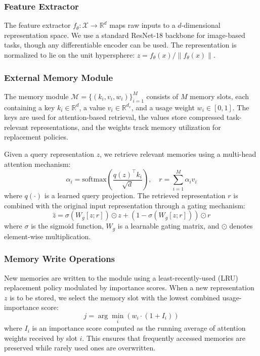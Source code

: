 \documentclass[11pt]{article}
\begin{document}
\subsubsection{Feature Extractor}

The feature extractor $f_\theta: \mathcal{X} \rightarrow \mathbb{R}^d$ maps raw inputs to a $d$-dimensional representation space. We use a standard ResNet-18 backbone \citep{he2016deep} for image-based tasks, though any differentiable encoder can be used. The representation is normalized to lie on the unit hypersphere: $z = f_\theta(x) / \|f_\theta(x)\|$.

\subsubsection{External Memory Module}

The memory module $\mathcal{M} = \{(k_i, v_i, w_i)\}_{i=1}^{M}$ consists of $M$ memory slots, each containing a key $k_i \in \mathbb{R}^d$, a value $v_i \in \mathbb{R}^{d_v}$, and a usage weight $w_i \in [0, 1]$. The keys are used for attention-based retrieval, the values store compressed task-relevant representations, and the weights track memory utilization for replacement policies.

Given a query representation $z$, we retrieve relevant memories using a multi-head attention mechanism:
\begin{equation}
    \alpha_i = \text{softmax}\left(\frac{q(z)^\top k_i}{\sqrt{d}}\right), \quad r = \sum_{i=1}^{M} \alpha_i v_i
\end{equation}
where $q(\cdot)$ is a learned query projection. The retrieved representation $r$ is combined with the original input representation through a gating mechanism:
\begin{equation}
    \hat{z} = \sigma(W_g [z; r]) \odot z + (1 - \sigma(W_g [z; r])) \odot r
\end{equation}
where $\sigma$ is the sigmoid function, $W_g$ is a learnable gating matrix, and $\odot$ denotes element-wise multiplication.

\subsubsection{Memory Write Operations}

New memories are written to the module using a least-recently-used (LRU) replacement policy modulated by importance scores. When a new representation $z$ is to be stored, we select the memory slot with the lowest combined usage-importance score:
\begin{equation}
    j = \arg\min_i \left( w_i \cdot (1 + I_i) \right)
\end{equation}
where $I_i$ is an importance score computed as the running average of attention weights received by slot $i$. This ensures that frequently accessed memories are preserved while rarely used ones are overwritten.
\end{document}
